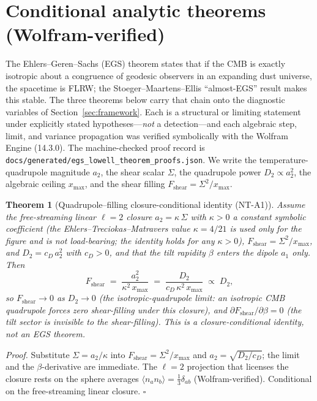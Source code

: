 \documentclass[11pt,a4paper]{article}
\newcommand{\xmax}{x_{\max}}
\newcommand{\Fshear}{F_{\mathrm{shear}}}
\theoremstyle{plain}
\newtheorem{theorem}{Theorem}
\theoremstyle{definition}
\begin{document}
\section{Conditional analytic theorems (Wolfram-verified)}
\label{sec:theorems}

The Ehlers--Geren--Sachs (EGS) theorem states that if the CMB is
exactly isotropic about a congruence of geodesic observers in an
expanding dust universe, the spacetime is FLRW; the
Stoeger--Maartens--Ellis ``almost-EGS'' result makes this stable.
The three theorems below carry that chain onto the diagnostic
variables of Section~\ref{sec:framework}. Each is a structural or
limiting statement under explicitly stated hypotheses---\emph{not} a
detection---and each algebraic step, limit, and variance
propagation was verified symbolically with the Wolfram Engine
(14.3.0). The machine-checked proof record is
\texttt{docs/generated/egs\_lowell\_theorem\_proofs.json}. We write
the temperature-quadrupole magnitude $a_2$, the shear scalar
$\Sigma$, the quadrupole power $D_2\propto a_2^2$, the algebraic
ceiling $\xmax$, and the shear filling $\Fshear=\Sigma^2/\xmax$.

\begin{theorem}[Quadrupole--filling closure-conditional identity (NT-A1)]
\label{thm:nt-a1}
Assume the free-streaming linear $\ell=2$ closure $a_2=\kappa\,\Sigma$
with $\kappa>0$ a constant symbolic coefficient (the
Ehlers--Treciokas--Matravers value $\kappa=4/21$ is used only for the
figure and is not load-bearing; the identity holds for any $\kappa>0$),
$\Fshear=\Sigma^2/\xmax$, and $D_2=c_D\,a_2^2$ with $c_D>0$, and that
the tilt rapidity $\beta$ enters the dipole $a_1$ only. Then
\begin{equation}
  \Fshear \;=\; \frac{a_2^2}{\kappa^2\,\xmax}
        \;=\; \frac{D_2}{c_D\,\kappa^2\,\xmax}
        \;\propto\; D_2 ,
\end{equation}
so $\Fshear\to0$ as $D_2\to0$ (the isotropic-quadrupole limit: an
isotropic CMB quadrupole forces zero shear-filling under this closure),
and $\partial\Fshear/\partial\beta=0$ (the tilt sector is invisible to
the shear-filling). This is a closure-conditional identity, not an EGS
theorem.
\end{theorem}

\noindent\emph{Proof.} Substitute $\Sigma=a_2/\kappa$ into
$\Fshear=\Sigma^2/\xmax$ and $a_2=\sqrt{D_2/c_D}$; the limit and the
$\beta$-derivative are immediate. The $\ell=2$ projection that
licenses the closure rests on the sphere averages
$\langle n_a n_b\rangle=\tfrac13\delta_{ab}$ (Wolfram-verified).
Conditional on the free-streaming linear closure. $\square$
\end{document}
